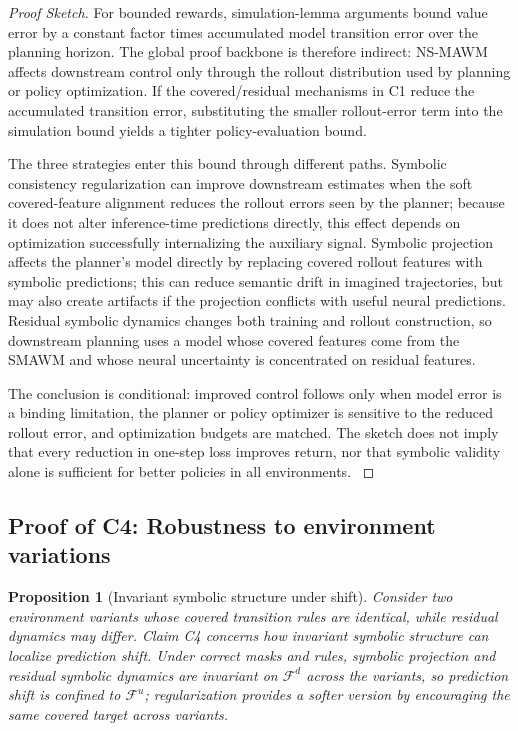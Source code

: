 \documentclass{article}
\theoremstyle{plain}
\newtheorem{proposition}[theorem]{Proposition}
\theoremstyle{definition}
\theoremstyle{remark}
\begin{document}
\begin{proof}[Proof Sketch]
  For bounded rewards, simulation-lemma arguments bound value error by a constant factor times accumulated model transition error over the planning horizon. The global proof backbone is therefore indirect: NS-MAWM affects downstream control only through the rollout distribution used by planning or policy optimization. If the covered/residual mechanisms in C1 reduce the accumulated transition error, substituting the smaller rollout-error term into the simulation bound yields a tighter policy-evaluation bound.

  The three strategies enter this bound through different paths. Symbolic consistency regularization can improve downstream estimates when the soft covered-feature alignment reduces the rollout errors seen by the planner; because it does not alter inference-time predictions directly, this effect depends on optimization successfully internalizing the auxiliary signal. Symbolic projection affects the planner's model directly by replacing covered rollout features with symbolic predictions; this can reduce semantic drift in imagined trajectories, but may also create artifacts if the projection conflicts with useful neural predictions. Residual symbolic dynamics changes both training and rollout construction, so downstream planning uses a model whose covered features come from the SMAWM and whose neural uncertainty is concentrated on residual features.

  The conclusion is conditional: improved control follows only when model error is a binding limitation, the planner or policy optimizer is sensitive to the reduced rollout error, and optimization budgets are matched. The sketch does not imply that every reduction in one-step loss improves return, nor that symbolic validity alone is sufficient for better policies in all environments.
  \label{app:proofs:c3}
\end{proof}

\subsection{Proof of C4: Robustness to environment variations}
\label{app:proof-c4}

\begin{proposition}[Invariant symbolic structure under shift]
  Consider two environment variants whose covered transition rules are identical, while residual dynamics may differ. Claim C4 concerns how invariant symbolic structure can localize prediction shift. Under correct masks and rules, symbolic projection and residual symbolic dynamics are invariant on $\mathcal{F}^d$ across the variants, so prediction shift is confined to $\mathcal{F}^u$; regularization provides a softer version by encouraging the same covered target across variants.
\end{proposition}
\end{document}
